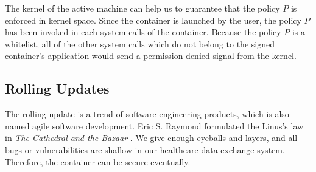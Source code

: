The kernel of the active machine can help us to guarantee that the policy $P$ is enforced in
kernel space. Since the container is launched by the user, the policy $P$
has been invoked in each system calls of the container. Because the policy $P$ is a whitelist,
all of the other system calls which do not belong to the signed container's application
would send a permission denied signal from the kernel.

\subsection{Rolling Updates}

The rolling update is a trend of software engineering products, which is
also named agile software development. Eric S. Raymond formulated
the Linus's law in \emph{The Cathedral and the Bazaar} \cite{9780596001087}.
We give enough eyeballs and layers, and all bugs or vulnerabilities are shallow in our
healthcare data exchange system. Therefore, the container can be secure eventually.
